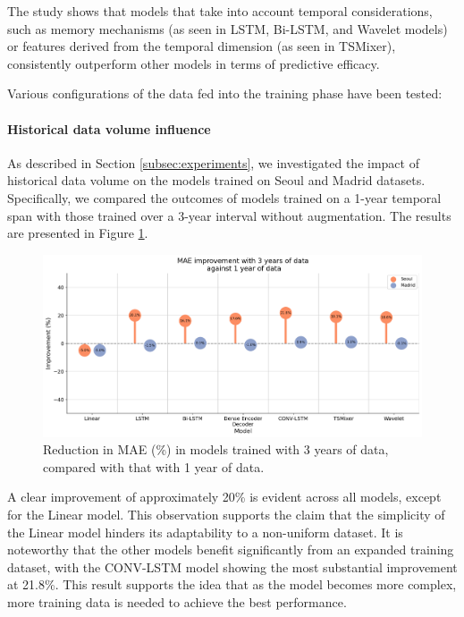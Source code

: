 The study shows that models that take into account temporal considerations, such as memory mechanisms (as seen in LSTM, Bi-LSTM, and Wavelet models) or features derived from the temporal dimension (as seen in TSMixer), consistently outperform other models in terms of predictive efficacy.

Various configurations of the data fed into the training phase have been tested:

\paragraph{Historical data volume influence}

As described in Section \ref{subsec:experiments}, we investigated the impact of historical data volume on the models trained on Seoul and Madrid datasets. Specifically, we compared the outcomes of models trained on a 1-year temporal span with those trained over a 3-year interval without augmentation. The results are presented in Figure \ref{fig:more_data_improv}.

\begin{figure}[h]
    \centering
    \includegraphics[width=1\linewidth]{images/improvement with more data.png}
    \caption{Reduction in MAE (\%) in models trained with 3 years of data, compared with that with 1 year of data.}
    \label{fig:more_data_improv}
\end{figure}

A clear improvement of approximately 20\% is evident across all models, except for the Linear model. This observation supports the claim that the simplicity of the Linear model hinders its adaptability to a non-uniform dataset. It is noteworthy that the other models benefit significantly from an expanded training dataset, with the CONV-LSTM model showing the most substantial improvement at 21.8\%. This result supports the idea that as the model becomes more complex, more training data is needed to achieve the best performance.

